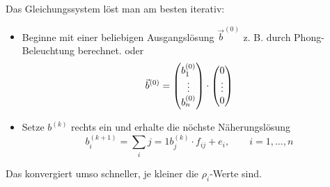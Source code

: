 Das Gleichungssystem löst man am besten iterativ:
\begin{itemize}
 \item Beginne mit einer beliebigen Ausgangslösung $\vec b^{(0)}$ z. B. durch Phong-Beleuchtung berechnet. oder
	\[\vec b^{(0)} = \begin{pmatrix}b_1^{(0)}\\\vdots\\b_n^{(0)}\end{pmatrix} \cdot \begin{pmatrix}0\\\vdots\\0\end{pmatrix}\]
 \item Setze $b^{(k)}$ rechts ein und erhalte die nöchste Näherungslösung
	\[\boxed{b_i^{(k+1)} = \sum\limits_{i}{j=1} b_j^{(k)} \cdot f_{ij} + e_i}, \qquad i = 1, ..., n\]
\end{itemize}
Das konvergiert umso schneller, je kleiner die $\rho_i$-Werte sind.

